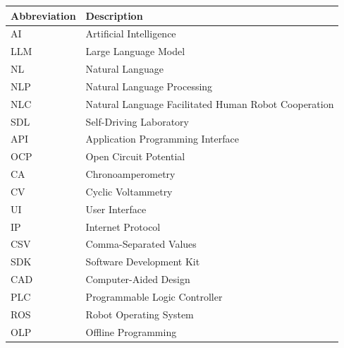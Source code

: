 \begin{formelzeichen}

\begin{longtable}{p{3cm} p{11cm}}
\textbf{Abbreviation} & \textbf{Description} \\ \hline
AI  & Artificial Intelligence \\
LLM & Large Language Model \\
NL & Natural Language \\
NLP & Natural Language Processing \\
NLC & Natural Language Facilitated Human Robot Cooperation \\
SDL & Self-Driving Laboratory \\
API & Application Programming Interface \\
OCP & Open Circuit Potential \\
CA  & Chronoamperometry \\
CV  & Cyclic Voltammetry \\
UI  & User Interface \\
IP  & Internet Protocol \\
CSV & Comma-Separated Values \\
SDK & Software Development Kit \\
CAD & Computer-Aided Design \\
PLC & Programmable Logic Controller \\
ROS & Robot Operating System \\
OLP & Offline Programming
\end{longtable}

\end{formelzeichen}

